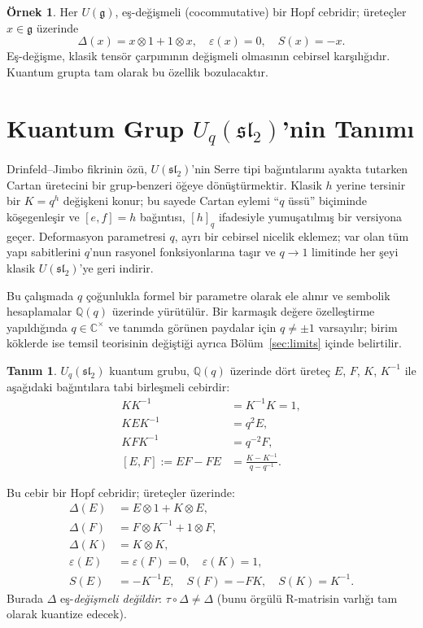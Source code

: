 \documentclass[10pt]{math}
\numberwithin{equation}{section}
\theoremstyle{plain}
\theoremstyle{definition}
\newtheorem{definition}[theorem]{Tanım}
\newtheorem{example}[theorem]{Örnek}
\renewcommand{\sl}{\mathfrak{sl}}
\newcommand{\gfrak}{\mathfrak{g}}
\newcommand{\Uq}{U_q(\sl_2)}
\newcommand{\Q}{\mathbb{Q}}
\newcommand{\C}{\mathbb{C}}
\newcommand{\eps}{\varepsilon}
\newcommand{\cop}{\Delta}
\newcommand{\qint}[1]{[#1]_q}
\begin{document}
\begin{example}
Her $U(\gfrak)$, eş-değişmeli (cocommutative) bir Hopf cebridir; üreteçler
$x \in \gfrak$ üzerinde
\[
  \cop(x) = x \otimes 1 + 1 \otimes x, \quad \eps(x) = 0, \quad S(x) = -x.
\]
Eş-değişme, klasik tensör çarpımının değişmeli olmasının cebirsel
karşılığıdır. Kuantum grupta tam olarak bu özellik bozulacaktır.
\end{example}

\section{Kuantum Grup $\Uq$'nin Tanımı}

Drinfeld--Jimbo fikrinin özü, $U(\sl_2)$'nin Serre tipi bağıntılarını ayakta
tutarken Cartan üretecini bir grup-benzeri öğeye dönüştürmektir. Klasik
$h$ yerine tersinir bir $K = q^h$ değişkeni konur; bu sayede Cartan eylemi
``$q$ üssü'' biçiminde köşegenleşir ve $[e,f]=h$ bağıntısı, $\qint{h}$
ifadesiyle yumuşatılmış bir versiyona geçer. Deformasyon parametresi $q$, ayrı
bir cebirsel nicelik eklemez; var olan tüm yapı sabitlerini $q$'nun rasyonel
fonksiyonlarına taşır ve $q\to 1$ limitinde her şeyi klasik $U(\sl_2)$'ye geri
indirir.

Bu çalışmada $q$ çoğunlukla formel bir parametre olarak ele alınır ve sembolik
hesaplamalar $\Q(q)$ üzerinde yürütülür. Bir karmaşık değere özelleştirme
yapıldığında $q\in\C^\times$ ve tanımda görünen paydalar için $q\neq \pm 1$
varsayılır; birim köklerde ise temsil teorisinin değiştiği ayrıca
Bölüm~\ref{sec:limits} içinde belirtilir.

\begin{definition}\label{def:Uq}
$\Uq$ kuantum grubu, $\Q(q)$ üzerinde dört üreteç $E$, $F$, $K$, $K^{-1}$
ile aşağıdaki bağıntılara tabi birleşmeli cebirdir:
\begin{align}
  K K^{-1} &= K^{-1} K = 1, \tag{R1} \\
  K E K^{-1} &= q^{2} E, \tag{R2} \\
  K F K^{-1} &= q^{-2} F, \tag{R3} \\
  [E, F] := EF - FE &= \frac{K - K^{-1}}{q - q^{-1}}. \tag{R4}
\end{align}
\end{definition}

Bu cebir bir Hopf cebridir; üreteçler üzerinde:
\begin{align}
  \cop(E) &= E \otimes 1 + K \otimes E, \\
  \cop(F) &= F \otimes K^{-1} + 1 \otimes F, \\
  \cop(K) &= K \otimes K, \\
  \eps(E) &= \eps(F) = 0, \quad \eps(K) = 1, \\
  S(E) &= -K^{-1} E, \quad S(F) = -F K, \quad S(K) = K^{-1}.
\end{align}
Burada $\cop$ eş-\emph{değişmeli değildir}: $\tau \circ \cop \neq \cop$ (bunu
örgülü R-matrisin varlığı tam olarak kuantize edecek).
\end{document}
